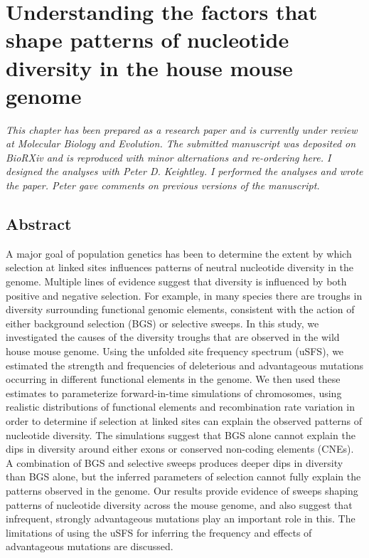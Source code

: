 \chapter{Understanding the factors that shape patterns of nucleotide diversity in the house mouse genome}



\emph{This chapter has been prepared as a research paper and is currently under review at Molecular Biology and Evolution. The submitted manuscript was deposited on \textit{BioRXiv} and is reproduced with minor alternations and re-ordering here. I designed the analyses with Peter D. Keightley. I performed the analyses and wrote the paper. Peter gave comments on previous versions of the manuscript.}

\section{Abstract}
	A major goal of population genetics has been to determine the extent by which selection at linked sites influences patterns of neutral nucleotide diversity in the genome. Multiple lines of evidence suggest that diversity is influenced by both positive and negative selection. For example, in many species there are troughs in diversity surrounding functional genomic elements, consistent with the action of either background selection (BGS) or selective sweeps. In this study, we investigated the causes of the diversity troughs that are observed in the wild house mouse genome. Using the unfolded site frequency spectrum (uSFS), we estimated the strength and frequencies of deleterious and advantageous mutations occurring in different functional elements in the genome. We then used these estimates to parameterize forward-in-time simulations of chromosomes, using realistic distributions of functional elements and recombination rate variation in order to determine if selection at linked sites can explain the observed patterns of nucleotide diversity. The simulations suggest that BGS alone cannot explain the dips in diversity around either exons or conserved non-coding elements (CNEs). A combination of BGS and selective sweeps produces deeper dips in diversity than BGS alone, but the inferred parameters of selection cannot fully explain the patterns observed in the genome. Our results provide evidence of sweeps shaping patterns of nucleotide diversity across the mouse genome, and also suggest that infrequent, strongly advantageous mutations play an important role in this. The limitations of using the uSFS for inferring the frequency and effects of advantageous mutations are discussed.

